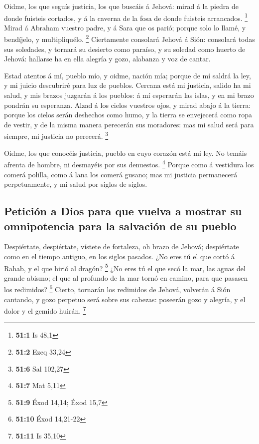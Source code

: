  Oidme, los que seguís justicia, los que buscáis á Jehová:
mirad á la piedra de donde fuisteis cortados, y á la caverna de la fosa
de donde fuisteis arrancados. \footnote{\textbf{51:1} Is 48,1}
 Mirad á Abraham vuestro padre, y á Sara que os parió;
porque solo lo llamé, y bendíjelo, y multipliquélo. \footnote{\textbf{51:2}
  Ezeq 33,24}  Ciertamente consolará Jehová á Sión:
consolará todas sus soledades, y tornará su desierto como paraíso, y su
soledad como huerto de Jehová: hallarse ha en ella alegría y gozo,
alabanza y voz de cantar.

 Estad atentos á mí, pueblo mío, y oidme, nación mía; porque
de mí saldrá la ley, y mi juicio descubriré para luz de pueblos.
 Cercana está mi justicia, salido ha mi salud, y mis brazos
juzgarán á los pueblos: á mí esperarán las islas, y en mi brazo pondrán
su esperanza.  Alzad á los cielos vuestros ojos, y mirad
abajo á la tierra: porque los cielos serán deshechos como humo, y la
tierra se envejecerá como ropa de vestir, y de la misma manera perecerán
sus moradores: mas mi salud será para siempre, mi justicia no perecerá.
\footnote{\textbf{51:6} Sal 102,27}

 Oidme, los que conocéis justicia, pueblo en cuyo corazón
está mi ley. No temáis afrenta de hombre, ni desmayéis por sus
denuestos. \footnote{\textbf{51:7} Mat 5,11}  Porque como á
vestidura los comerá polilla, como á lana los comerá gusano; mas mi
justicia permanecerá perpetuamente, y mi salud por siglos de siglos.

\hypertarget{peticiuxf3n-a-dios-para-que-vuelva-a-mostrar-su-omnipotencia-para-la-salvaciuxf3n-de-su-pueblo}{%
\subsection{Petición a Dios para que vuelva a mostrar su omnipotencia
para la salvación de su
pueblo}\label{peticiuxf3n-a-dios-para-que-vuelva-a-mostrar-su-omnipotencia-para-la-salvaciuxf3n-de-su-pueblo}}

 Despiértate, despiértate, vístete de fortaleza, oh brazo de
Jehová; despiértate como en el tiempo antiguo, en los siglos pasados.
¿No eres tú el que cortó á Rahab, y el que hirió al dragón? \footnote{\textbf{51:9}
  Éxod 14,14; Éxod 15,7}  ¿No eres tú el que secó la mar,
las aguas del grande abismo; el que al profundo de la mar tornó en
camino, para que pasasen los redimidos? \footnote{\textbf{51:10} Éxod
  14,21-22}  Cierto, tornarán los redimidos de Jehová,
volverán á Sión cantando, y gozo perpetuo será sobre sus cabezas:
poseerán gozo y alegría, y el dolor y el gemido huirán. \footnote{\textbf{51:11}
  Is 35,10}

